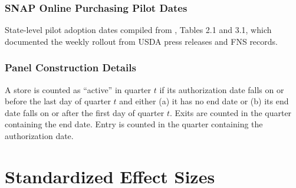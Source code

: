 \documentclass[12pt]{article}
\begin{document}
\subsubsection*{SNAP Online Purchasing Pilot Dates} State-level pilot adoption dates compiled from \citet{jones_2024}, Tables 2.1 and 3.1, which documented the weekly rollout from USDA press releases and FNS records.

\subsubsection*{Panel Construction Details} A store is counted as ``active'' in quarter $t$ if its authorization date falls on or before the last day of quarter $t$ and either (a) it has no end date or (b) its end date falls on or after the first day of quarter $t$. Exits are counted in the quarter containing the end date. Entry is counted in the quarter containing the authorization date.

\section{Standardized Effect Sizes}
\label{sec:sde}

\begin{table}[H]
\centering
\begin{threeparttable}

\end{threeparttable}
\end{table}
\end{document}
